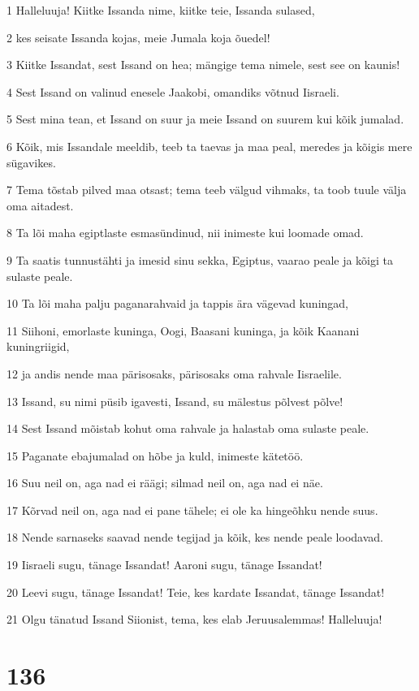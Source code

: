 \par 1 Halleluuja! Kiitke Issanda nime, kiitke teie, Issanda sulased,
\par 2 kes seisate Issanda kojas, meie Jumala koja õuedel!
\par 3 Kiitke Issandat, sest Issand on hea; mängige tema nimele, sest see on kaunis!
\par 4 Sest Issand on valinud enesele Jaakobi, omandiks võtnud Iisraeli.
\par 5 Sest mina tean, et Issand on suur ja meie Issand on suurem kui kõik jumalad.
\par 6 Kõik, mis Issandale meeldib, teeb ta taevas ja maa peal, meredes ja kõigis mere sügavikes.
\par 7 Tema tõstab pilved maa otsast; tema teeb välgud vihmaks, ta toob tuule välja oma aitadest.
\par 8 Ta lõi maha egiptlaste esmasündinud, nii inimeste kui loomade omad.
\par 9 Ta saatis tunnustähti ja imesid sinu sekka, Egiptus, vaarao peale ja kõigi ta sulaste peale.
\par 10 Ta lõi maha palju paganarahvaid ja tappis ära vägevad kuningad,
\par 11 Siihoni, emorlaste kuninga, Oogi, Baasani kuninga, ja kõik Kaanani kuningriigid,
\par 12 ja andis nende maa pärisosaks, pärisosaks oma rahvale Iisraelile.
\par 13 Issand, su nimi püsib igavesti, Issand, su mälestus põlvest põlve!
\par 14 Sest Issand mõistab kohut oma rahvale ja halastab oma sulaste peale.
\par 15 Paganate ebajumalad on hõbe ja kuld, inimeste kätetöö.
\par 16 Suu neil on, aga nad ei räägi; silmad neil on, aga nad ei näe.
\par 17 Kõrvad neil on, aga nad ei pane tähele; ei ole ka hingeõhku nende suus.
\par 18 Nende sarnaseks saavad nende tegijad ja kõik, kes nende peale loodavad.
\par 19 Iisraeli sugu, tänage Issandat! Aaroni sugu, tänage Issandat!
\par 20 Leevi sugu, tänage Issandat! Teie, kes kardate Issandat, tänage Issandat!
\par 21 Olgu tänatud Issand Siionist, tema, kes elab Jeruusalemmas! Halleluuja!

\chapter{136}

